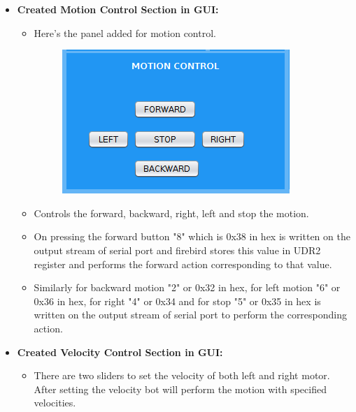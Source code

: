 \documentclass[a4paper,12pt,oneside]{book}
\begin{document}
\begin{enumerate}
\begin{itemize}
\begin{itemize}
			\end{itemize}   
			\newpage
			\item \textbf{Created Motion Control Section in GUI:}
			\begin{itemize}
				\item Here's the panel added for motion control.\\
				\begin{figure}[h]
					\begin{center}
						\includegraphics[scale=1]{motioncontrol.png}
					\end{center}
				\end{figure}
				\item  Controls the forward, backward, right, left and stop the motion.
				\item On pressing the forward button "8" which is 0x38 in hex is written on the output stream of serial port and firebird stores this value in UDR2 register and performs the forward action corresponding to that value. 
				\item Similarly for backward motion "2" or 0x32 in hex, for left motion "6" or 0x36 in hex, for right "4" or 0x34 and for stop "5" or 0x35 in hex is written on the output stream of serial port to perform the corresponding action.
			\end{itemize}  
			\newpage    
			\item \textbf{Created Velocity Control Section in GUI:}
			\begin{itemize}
				\item There are two sliders to set the velocity of both left and right motor. After setting the velocity bot will perform the motion with specified velocities.\\
				\begin{figure}[h]
					\begin{center}

\end{center}
\end{figure}
\end{itemize}
\end{itemize}
\end{enumerate}
\end{document}
